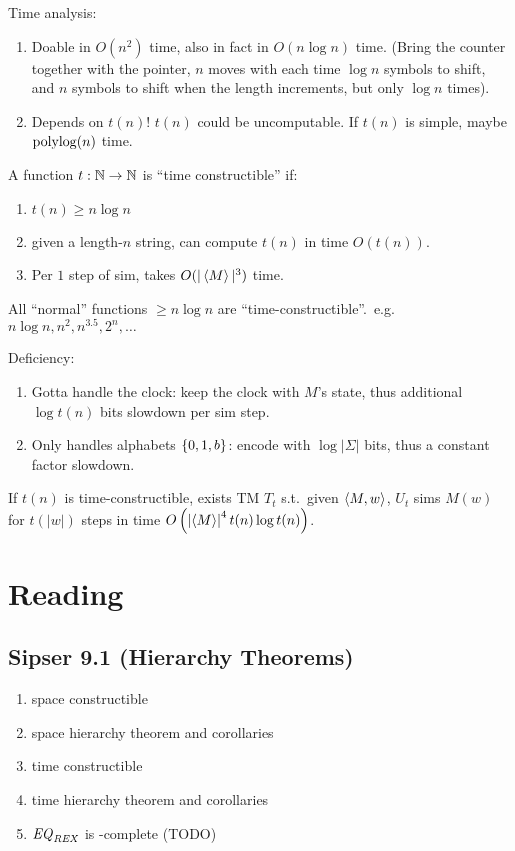 \documentclass{article}
\begin{document}
Time analysis:
\begin{enumerate}
  \item Doable in \(O(n^2)\) time, also in fact in \(O(n\log n)\) time. (Bring the counter together with the pointer, \(n\) moves with each time \(\log n\) symbols to shift, and \(n\) symbols to shift when the length increments, but only \(\log n\) times).
  \item Depends on \(t(n)\)! \(t(n)\) could be uncomputable. If \(t(n)\) is simple, maybe \(\operatorname{polylog}(n)\) time.
\end{enumerate}

\begin{definition}
  A function \(t: \mathbb N \to \mathbb N\) is ``time constructible'' if:
  \begin{enumerate}
    \item \(t(n) \geq n \log n\)
    \item given a length-\(n\) string, can compute \(t(n)\) in time \(O(t(n))\).
    \item Per \(1\) step of sim, takes \(O(|\left\langle M \right\rangle|^3)\) time.
  \end{enumerate}
\end{definition}

\begin{remark}
  All ``normal'' functions \(\geq n \log n\) are ``time-constructible''.\ e.g. \(n\log n, n^2, n^{3.5}, 2^n, \ldots\)
\end{remark}

Deficiency:
\begin{enumerate}
  \item Gotta handle the clock: keep the clock with \(M\)'s state, thus additional \(\log t(n)\) bits slowdown per sim step.
  \item Only handles alphabets \(\left\lbrace 0, 1, b \right\rbrace\): encode with \(\log |\Sigma|\) bits, thus a constant factor slowdown.
\end{enumerate}

\begin{theorem}
  If \(t(n)\) is time-constructible, exists TM \(T_t\) s.t.\ given \(\left\langle M, w \right\rangle\), \(U_t\) sims \(M(w)\) for \(t(|w|)\) steps in time \(O\left\lparen \left\lvert \left\langle M \right\rangle \right\rvert^4 t(n) \log t(n) \right\rparen\).
\end{theorem}

\section{Reading}

\subsection{Sipser 9.1 (Hierarchy Theorems)}

\begin{enumerate}
  \item space constructible
  \item space hierarchy theorem and corollaries
  \item time constructible
  \item time hierarchy theorem and corollaries
  \item \({\it EQ}_{\it REX}\) is \EXPSPACE-complete (TODO)
\end{enumerate}
\end{document}
